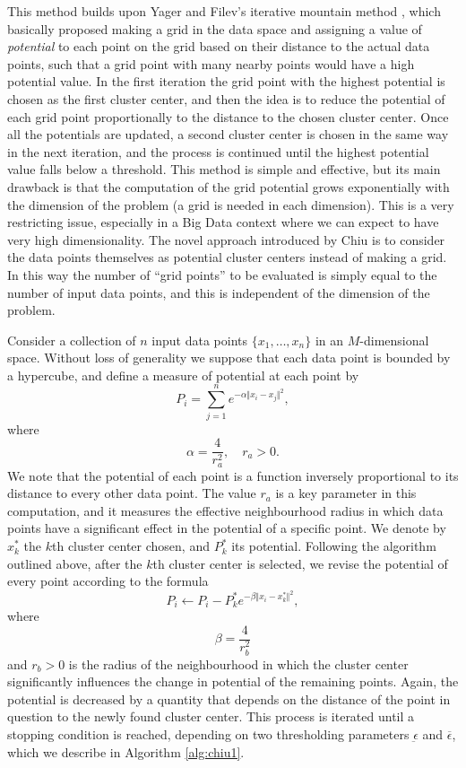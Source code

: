 This method builds upon Yager and Filev's iterative mountain method \cite{yager1994approximate}, which basically proposed making a grid in the data space and assigning a value of \textit{potential} to each point on the grid based on their distance to the actual data points, such that a grid point with many nearby points would have a high potential value. In the first iteration the grid point with the highest potential is chosen as the first cluster center, and then the idea is to reduce the potential of each grid point proportionally to the distance to the chosen cluster center. Once all the potentials are updated, a second cluster center is chosen in the same way in the next iteration, and the process is continued until the highest potential value falls below a threshold. This method is simple and effective, but its main drawback is that the computation of the grid potential grows exponentially with the dimension of the problem (a grid is needed in each dimension). This is a very restricting issue, especially in a Big Data context where we can expect to have very high dimensionality. The novel approach introduced by Chiu is to consider the data points themselves as potential cluster centers instead of making a grid. In this way the number of ``grid points'' to be evaluated is simply equal to the number of input data points, and this is independent of the dimension of the problem.

Consider a collection of $n$ input data points $\{x_1,\dots,x_n\}$ in an $M$-dimensional space. Without loss of generality we suppose that each data point is bounded by a hypercube, and define a measure of potential at each point by
\begin{equation} \label{eq:chiu-pot}
P_i = \sum_{j=1}^n e^{-\alpha \Vert x_i-x_j \Vert^2},
\end{equation}
where
\[
\alpha = \frac{4}{r_a^2}, \quad r_a > 0.
\]
We note that the potential of each point is a function inversely proportional to its distance to every other data point. The value $r_a$ is a key parameter in this computation, and it measures the effective neighbourhood radius in which data points have a significant effect in the potential of a specific point. We denote by $x_k^\ast$ the $k$th cluster center chosen, and $P_k^\ast$ its potential. Following the algorithm outlined above, after the $k$th cluster center is selected, we revise the potential of every point according to the formula
\[
P_i \leftarrow P_i - P_k^\ast e^{-\beta \Vert x_i - x_k^\ast \Vert^2},
\]
where
\[
\beta = \frac{4}{r_b^2}
\]
and $r_b>0$ is the radius of the neighbourhood in which the cluster center significantly influences the change in potential of the remaining points. Again, the potential is decreased by a quantity that depends on the distance of the point in question to the newly found cluster center. This process is iterated until a stopping condition is reached, depending on two thresholding parameters $\underbar{\epsilon}$ and $\overbar{\epsilon}$, which we describe in Algorithm \ref{alg:chiu1}.

